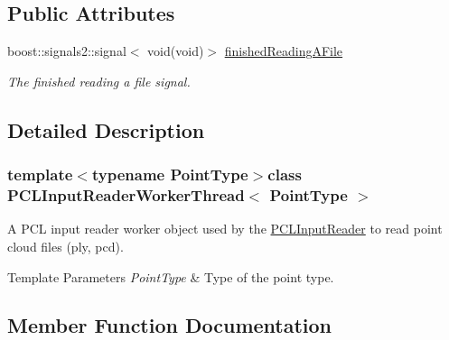 \subsection*{Public Attributes}
\begin{DoxyCompactItemize}
\item 
\hypertarget{class_p_c_l_input_reader_worker_thread_a432c3b7de15d713d8e8a626af938f44f}{}boost\+::signals2\+::signal$<$ void(void)$>$ \hyperlink{class_p_c_l_input_reader_worker_thread_a432c3b7de15d713d8e8a626af938f44f}{finished\+Reading\+A\+File}\label{class_p_c_l_input_reader_worker_thread_a432c3b7de15d713d8e8a626af938f44f}

\begin{DoxyCompactList}\small\item\em The finished reading a file signal. \end{DoxyCompactList}\end{DoxyCompactItemize}


\subsection{Detailed Description}
\subsubsection*{template$<$typename Point\+Type$>$class P\+C\+L\+Input\+Reader\+Worker\+Thread$<$ Point\+Type $>$}

A P\+C\+L input reader worker object used by the \hyperlink{class_p_c_l_input_reader}{P\+C\+L\+Input\+Reader} to read point cloud files (ply, pcd). 


\begin{DoxyTemplParams}{Template Parameters}
{\em Point\+Type} & Type of the point type. \\
\hline
\end{DoxyTemplParams}


\subsection{Member Function Documentation}
\hypertarget{class_p_c_l_input_reader_worker_thread_ab0a65a6918b081159c2c41f5df01176e}{}
